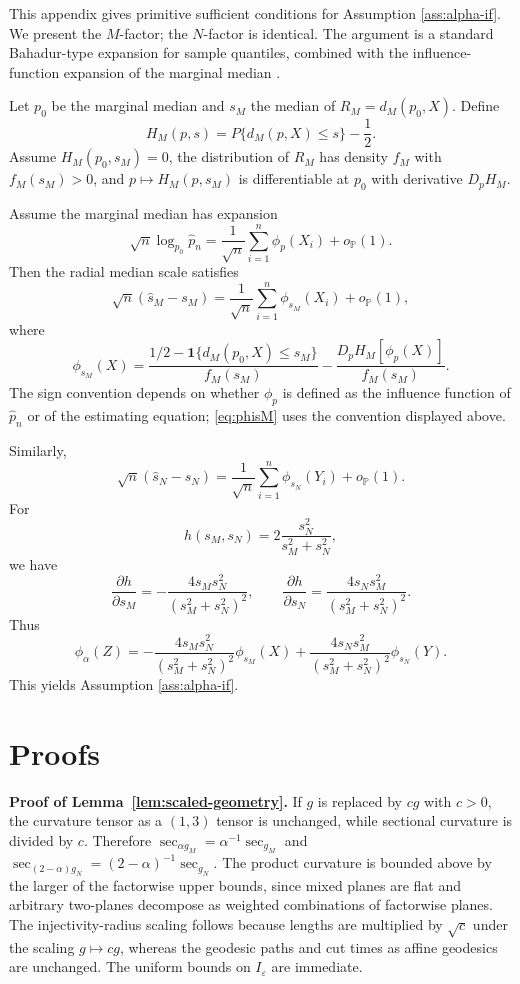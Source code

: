 \documentclass[11pt]{article}
\DeclareMathOperator{\secop}{sec}
\newcommand{\Pbb}{\mathbb P}
\newcommand{\eps}{\varepsilon}
\newcommand{\1}{\mathbf{1}}
\begin{document}
This appendix gives primitive sufficient conditions for Assumption \ref{ass:alpha-if}.  We present the $M$-factor; the $N$-factor is identical. The argument is a standard Bahadur-type expansion for sample quantiles, combined with the influence-function expansion of the marginal median \citep{bahadur_1966_NoteQuantilesLarge, serfling_1980_ApproximationTheoremsMathematical}. 

Let $p_0$ be the marginal median and $s_M$ the median of $R_M=d_M(p_0,X)$.  Define
\[
 H_M(p,s)=P\{d_M(p,X)\le s\}-\frac12.
\]
Assume $H_M(p_0,s_M)=0$, the distribution of $R_M$ has density $f_M$ with $f_M(s_M)>0$, and $p\mapsto H_M(p,s_M)$ is differentiable at $p_0$ with derivative $D_pH_M$.

Assume the marginal median has expansion
\[
 \sqrt n\log_{p_0}\widehat p_n
 =\frac1{\sqrt n}\sum_{i=1}^n\phi_p(X_i)+o_{\Pbb}(1).
\]
Then the radial median scale satisfies
\begin{equation}\label{eq:scale-if-M}
 \sqrt n(\widehat s_M-s_M)
 =\frac1{\sqrt n}\sum_{i=1}^n\phi_{s_M}(X_i)+o_{\Pbb}(1),
\end{equation}
where
\begin{equation}\label{eq:phisM}
 \phi_{s_M}(X)
 =
 \frac{1/2-\1\{d_M(p_0,X)\le s_M\}}{f_M(s_M)}
 -
 \frac{D_pH_M[\phi_p(X)]}{f_M(s_M)}.
\end{equation}
The sign convention depends on whether $\phi_p$ is defined as the influence function of $\widehat p_n$ or of the estimating equation; \eqref{eq:phisM} uses the convention displayed above.

Similarly,
\[
 \sqrt n(\widehat s_N-s_N)
 =\frac1{\sqrt n}\sum_{i=1}^n\phi_{s_N}(Y_i)+o_{\Pbb}(1).
\]
For
\[
 h(s_M,s_N)=2\frac{s_N^2}{s_M^2+s_N^2},
\]
we have
\[
 \frac{\partial h}{\partial s_M}
 =-\frac{4s_Ms_N^2}{(s_M^2+s_N^2)^2},
 \qquad
 \frac{\partial h}{\partial s_N}
 =\frac{4s_Ns_M^2}{(s_M^2+s_N^2)^2}.
\]
Thus
\begin{equation}\label{eq:alpha-if-formula}
 \phi_\alpha(Z)
 =
 -\frac{4s_Ms_N^2}{(s_M^2+s_N^2)^2}\phi_{s_M}(X)
 +
 \frac{4s_Ns_M^2}{(s_M^2+s_N^2)^2}\phi_{s_N}(Y).
\end{equation}
This yields Assumption \ref{ass:alpha-if}.


\section{Proofs}

\noindent \textbf{Proof of Lemma~\ref{lem:scaled-geometry}.}
If $g$ is replaced by $cg$ with $c>0$, the curvature tensor as a $(1,3)$ tensor is unchanged, while sectional curvature is divided by $c$.  Therefore $\secop_{\alpha g_M}=\alpha^{-1}\secop_{g_M}$ and $\secop_{(2-\alpha)g_N}=(2-\alpha)^{-1}\secop_{g_N}$.  The product curvature is bounded above by the larger of the factorwise upper bounds, since mixed planes are flat and arbitrary two-planes decompose as weighted combinations of factorwise planes.  The injectivity-radius scaling follows because lengths are multiplied by $\sqrt c$ under the scaling $g\mapsto cg$, whereas the geodesic paths and cut times as affine geodesics are unchanged.  The uniform bounds on $I_\eps$ are immediate.
\end{document}

